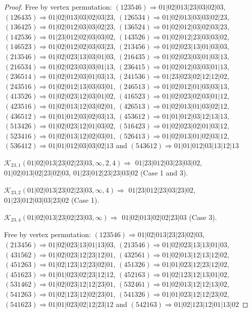 \documentclass[12pt]{article}
\theoremstyle{plain}
\theoremstyle{definition}
\theoremstyle{remark}
\newcommand{\fancy}[1]{\mathcal{#1}}
\def\K{\fancy{K}}
\begin{document}
\begin{proof}
	Free by vertex permutation: $(1 2 3 5 4 6)\Rightarrow 01|02|013|23|03|02|03$, $(1 2 6 4 3 5)\Rightarrow 01|02|013|03|02|03|23$, $(1 2 6 5 3 4)\Rightarrow 01|02|013|03|03|02|23$, $(1 3 6 4 2 5)\Rightarrow 01|02|012|03|03|02|23$, $(1 3 6 5 2 4)\Rightarrow 01|02|012|03|02|03|23$, $(1 4 2 5 3 6)\Rightarrow 01|23|012|02|03|03|02$, $(1 4 3 5 2 6)\Rightarrow 01|02|012|23|03|03|02$, $(1 4 6 5 2 3)\Rightarrow 01|02|012|02|03|03|23$, $(2 1 3 4 5 6)\Rightarrow 01|02|023|13|01|03|03$, $(2 1 3 5 4 6)\Rightarrow 01|02|023|13|03|01|03$, $(2 1 6 4 3 5)\Rightarrow 01|02|023|03|01|03|13$, $(2 1 6 5 3 4)\Rightarrow 01|02|023|03|03|01|13$, $(2 3 6 4 1 5)\Rightarrow 01|02|012|03|03|01|13$, $(2 3 6 5 1 4)\Rightarrow 01|02|012|03|01|03|13$, $(2 4 1 5 3 6)\Rightarrow 01|23|023|02|12|12|02$, $(2 4 3 5 1 6)\Rightarrow 01|02|012|13|03|03|01$, $(2 4 6 5 1 3)\Rightarrow 01|02|012|01|03|03|13$, $(4 1 3 5 2 6)\Rightarrow 01|02|023|12|03|01|02$, $(4 1 6 5 2 3)\Rightarrow 01|02|023|02|03|01|12$, $(4 2 3 5 1 6)\Rightarrow 01|02|013|12|03|02|01$, $(4 2 6 5 1 3)\Rightarrow 01|02|013|01|03|02|12$, $(4 3 6 5 1 2)\Rightarrow 01|01|012|03|02|03|13$, $(4 5 3 6 1 2)\Rightarrow 01|01|012|03|12|13|13$, $(5 1 3 4 2 6)\Rightarrow 01|02|023|12|01|03|02$, $(5 1 6 4 2 3)\Rightarrow 01|02|023|02|01|03|12$, $(5 2 3 4 1 6)\Rightarrow 01|02|013|12|02|03|01$, $(5 2 6 4 1 3)\Rightarrow 01|02|013|01|02|03|12$, $(5 3 6 4 1 2)\Rightarrow 01|01|012|03|03|02|13$ and $(5 4 3 6 1 2)\Rightarrow 01|01|012|03|13|12|13$
	
	
	
	\bigskip
	
	$\K_{23,1}(01|02|013|23|02|23|03,\infty,2, 4)\Rightarrow $ $01|23|012|03|23|03|02$, $01|02|013|02|23|02|03$, $01|23|012|23|23|03|02$ (Case 1 and 3).
	
	$\K_{23,2}(01|02|013|23|02|23|03,\infty,4)\Rightarrow $ $01|23|012|23|03|23|02$, $01|23|012|03|03|23|02$ (Case 1).
	
	$\K_{23,4}(01|02|013|23|02|23|03,\infty)\Rightarrow $ $01|02|013|02|02|23|03$ (Case 3).
	
	
	
	Free by vertex permutation: $(1 2 3 5 4 6)\Rightarrow 01|02|013|23|23|02|03$, $(2 1 3 4 5 6)\Rightarrow 01|02|023|13|01|13|03$, $(2 1 3 5 4 6)\Rightarrow 01|02|023|13|13|01|03$, $(4 3 1 5 6 2)\Rightarrow 01|02|023|12|23|12|01$, $(4 3 2 5 6 1)\Rightarrow 01|02|013|12|13|12|02$, $(4 5 1 2 6 3)\Rightarrow 01|02|123|12|23|02|01$, $(4 5 1 3 2 6)\Rightarrow 01|01|023|12|23|12|02$, $(4 5 1 6 2 3)\Rightarrow 01|01|023|02|23|12|12$, $(4 5 2 1 6 3)\Rightarrow 01|02|123|12|13|01|02$, $(5 3 1 4 6 2)\Rightarrow 01|02|023|12|12|23|01$, $(5 3 2 4 6 1)\Rightarrow 01|02|013|12|12|13|02$, $(5 4 1 2 6 3)\Rightarrow 01|02|123|12|02|23|01$, $(5 4 1 3 2 6)\Rightarrow 01|01|023|12|12|23|02$, $(5 4 1 6 2 3)\Rightarrow 01|01|023|02|12|23|12$ and $(5 4 2 1 6 3)\Rightarrow 01|02|123|12|01|13|02$
	

\end{proof}
\end{document}
